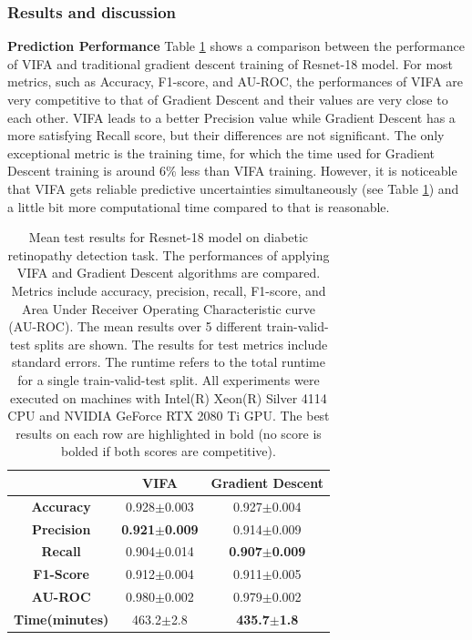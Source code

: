 \documentclass[10pt]{article} %
\begin{document}
\subsubsection{Results and discussion}

\textbf{Prediction Performance}
Table \ref{table: VIFA_GD_comparison} shows a comparison between the performance of VIFA and traditional gradient descent training of Resnet-18 model. For most metrics, such as Accuracy, F1-score, and AU-ROC, the performances of VIFA are very competitive to that of Gradient Descent and their values are very close to each other. VIFA leads to a better Precision value while Gradient Descent has a more satisfying Recall score, but their differences are not significant. The only exceptional metric is the training time, for which the time used for Gradient Descent training is around 6\% less than VIFA training. However, it is noticeable that VIFA gets reliable predictive uncertainties simultaneously (see Table \ref{table: VIFA_GD_comparison}) and a little bit more computational time compared to that is reasonable. 

\begin{table}[!htp]
\caption{Mean test results for Resnet-18 model on diabetic retinopathy detection task. The performances of applying VIFA and Gradient Descent algorithms are compared. Metrics include accuracy, precision, recall, F1-score, and Area Under Receiver Operating Characteristic curve (AU-ROC). The mean results over 5 different train-valid-test splits are shown. The results for test metrics include standard errors. The runtime refers to the total runtime for a single train-valid-test split. All experiments were executed on machines with Intel(R) Xeon(R) Silver 4114 CPU and NVIDIA GeForce RTX 2080 Ti GPU. The best results on each row are highlighted in bold (no score is bolded if both scores are competitive).}
\label{table: VIFA_GD_comparison}
\begin{center}
\begin{tabular}{c|cc}
                   & \textbf{VIFA}        & \textbf{Gradient Descent} \\ \hline
\textbf{Accuracy}  & 0.928$\pm$0.003 & 0.927$\pm$0.004               \\
\textbf{Precision} & \textbf{0.921$\pm$0.009} & 0.914$\pm$0.009               \\
\textbf{Recall}    & 0.904$\pm$0.014 & \textbf{0.907$\pm$0.009}               \\
\textbf{F1-Score}  & 0.912$\pm$0.004 & 0.911$\pm$0.005              \\
\textbf{AU-ROC}    & 0.980$\pm$0.002          & 0.979$\pm$0.002      \\
\textbf{Time(minutes)}      & 463.2$\pm$2.8        & \textbf{435.7$\pm$1.8}   
\end{tabular}
\end{center}
\end{table}
\end{document}
